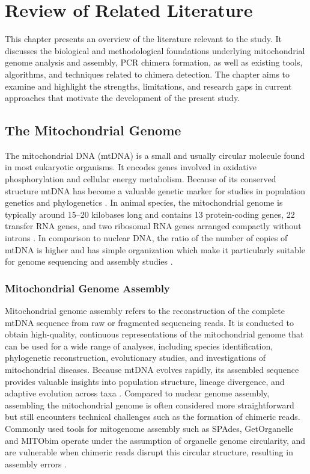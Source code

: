 
\chapter{Review of Related Literature}
\label{sec:relatedlit}

This chapter presents an overview of the literature relevant to the study. It discusses the biological and methodological foundations underlying mitochondrial genome analysis and assembly, PCR chimera formation, as well as existing tools, algorithms, and techniques related to chimera detection. The chapter aims to examine and highlight the strengths, limitations, and research gaps in current approaches that motivate the development of the present study.

\section{The Mitochondrial Genome}

The mitochondrial DNA (mtDNA) is a small and usually circular molecule found in most eukaryotic organisms. It encodes genes involved in oxidative phosphorylation and cellular energy metabolism. Because of its conserved structure mtDNA has become a valuable genetic marker for studies in population genetics and phylogenetics \citep{Anderson1981,Boore1999}. 
In animal species, the mitochondrial genome is typically around 15–20 kilobases long and contains 13 protein-coding genes, 22 transfer RNA genes, and two ribosomal RNA genes arranged compactly without introns \citep{Gray2012}. In comparison to nuclear DNA, the ratio of the number of copies of mtDNA is higher and has simple organization which make it particularly suitable for genome sequencing and assembly studies \citep{Dierckxsens2017}. 

\subsection{Mitochondrial Genome Assembly}

Mitochondrial genome assembly refers to the reconstruction of the complete mtDNA sequence from raw or fragmented sequencing reads. It is conducted to obtain high-quality, continuous representations of the mitochondrial genome that can be used for a wide range of analyses, including species identification, phylogenetic reconstruction, evolutionary studies, and investigations of mitochondrial diseases. Because mtDNA evolves rapidly, its assembled sequence provides valuable insights into population structure, lineage divergence, and adaptive evolution across taxa \citep{Boore1999}. Compared to nuclear genome assembly, assembling the mitochondrial genome is often considered more straightforward but still encounters technical challenges such as the formation of chimeric reads. Commonly used tools for mitogenome assembly such as SPAdes, GetOrganelle and MITObim operate under the assumption of organelle genome circularity, and are vulnerable when chimeric reads disrupt this circular structure, resulting in assembly errors \citep{Jin2020, Hahn2013}.

